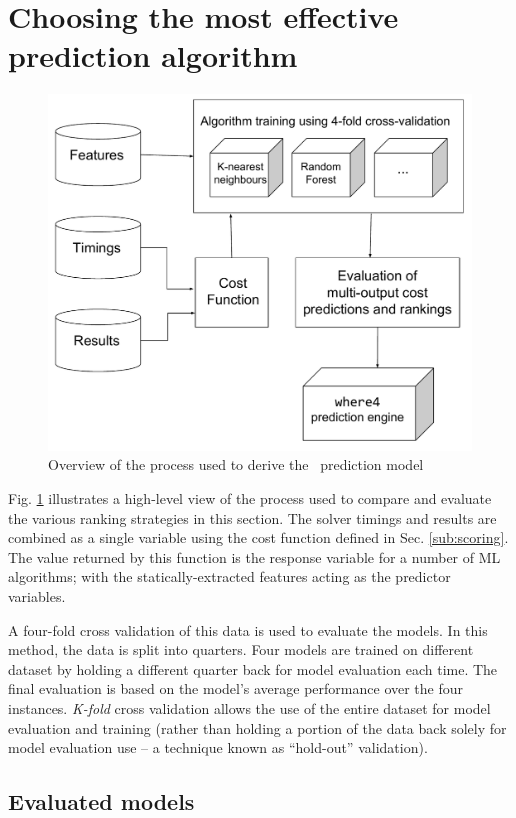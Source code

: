 \section{Choosing the most effective prediction algorithm}
\label{pred:choosing}
\begin{figure}
	\centering
	\includegraphics[width=0.9\linewidth]{Figures/Chapter4}
	\caption{Overview of the process used to derive the \where~prediction model}
	\label{fig:Chapter4}
\end{figure}

Fig. \ref{fig:Chapter4} illustrates a high-level view of the process used to compare and evaluate the various ranking strategies in this section. 
The solver timings and results are combined as a single variable using the cost function defined in Sec. \ref{sub:scoring}.
The value returned by this function is the response variable for a number of ML algorithms; with the statically-extracted features acting as the predictor variables.

A four-fold cross validation of this data is used to evaluate the models. 
In this method, the data is split into quarters.
Four models are trained on different dataset by holding a different quarter back for model evaluation each time.
The final evaluation is based on the model's average performance over the four instances.
\textit{K-fold} cross validation allows the use of the entire dataset for model evaluation and training (rather than holding a portion of the data back solely for model evaluation use -- a technique known as ``hold-out'' validation).   

\subsection{Evaluated models}

